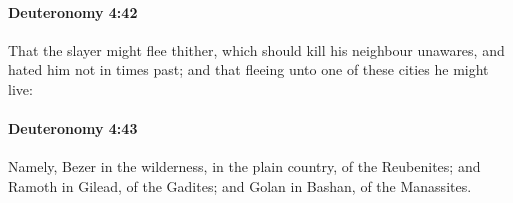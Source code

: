 		\paragraph{Deuteronomy 4:42} %
			\label{DEUTERONOMY-4-42}

			That the slayer might flee thither, which should kill his neighbour unawares, and hated him not in times past; and that fleeing unto one of these cities he might live:


		\paragraph{Deuteronomy 4:43} %
			\label{DEUTERONOMY-4-43}

			Namely, Bezer in the wilderness, in the plain country, of the Reubenites; and Ramoth in Gilead, of the Gadites; and Golan in Bashan, of the Manassites.



